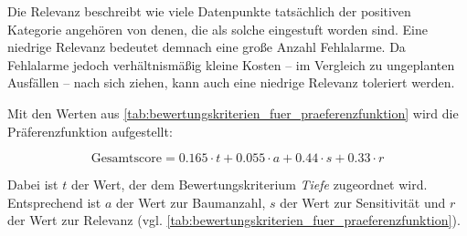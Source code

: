 Die Relevanz beschreibt wie viele Datenpunkte tatsächlich der positiven Kategorie angehören von denen, die als solche eingestuft worden sind. Eine niedrige Relevanz bedeutet demnach eine große Anzahl Fehlalarme. Da Fehlalarme jedoch verhältnismäßig kleine Kosten -- im Vergleich zu ungeplanten Ausfällen -- nach sich ziehen, kann auch eine niedrige Relevanz toleriert werden.

Mit den Werten aus \cref{tab:bewertungskriterien_fuer_praeferenzfunktion} wird die Präferenzfunktion aufgestellt:

\begin{equation*}
	\text{Gesamtscore}=0.165\cdot t+
	0.055\cdot a+0.44\cdot s+0.33\cdot r
	\label{eq:praeferenzfunktion}
\end{equation*}

Dabei ist $t$ der Wert, der dem Bewertungskriterium \textit{Tiefe} zugeordnet wird. Entsprechend ist $a$ der Wert zur Baumanzahl, $s$ der Wert zur Sensitivität und $r$ der Wert zur Relevanz (vgl. \cref{tab:bewertungskriterien_fuer_praeferenzfunktion}).

